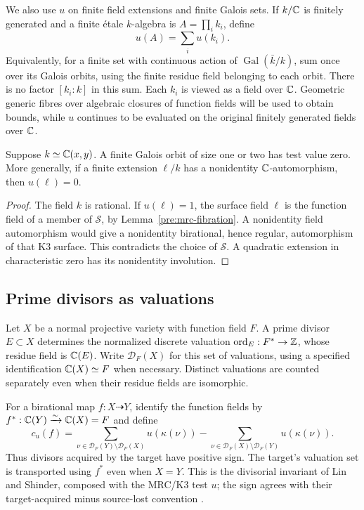 We also use $u$ on finite field extensions and finite Galois sets.
If $k/\mathbb C$ is finitely generated and a finite \mbox{\'{e}tale}
$k$-algebra is $A=\prod_i k_i$, define
\begin{equation}\label{pre:finite-orbits}
 u(A)=\sum_i u(k_i).
\end{equation}
Equivalently, for a finite set with continuous action of
$\operatorname{Gal}(\bar k/k)$, sum once over its Galois orbits, using
the finite residue field belonging to each orbit. There is no factor
$[k_i:k]$ in this sum. Each $k_i$ is viewed as a field over $\mathbb C$.
Geometric generic fibres over algebraic closures of function fields will
be used to obtain bounds, while $u$ continues to be evaluated on the
original finitely generated fields over $\mathbb C$.

\begin{lemma}\label{pre:small-orbits}
Suppose $k\simeq\mathbb C(x,y)$. A finite Galois orbit of size one or two
has test value zero. More generally, if a finite extension $\ell/k$
has a nonidentity $\mathbb C$-automorphism, then $u(\ell)=0$.
\end{lemma}

\begin{proof}
The field $k$ is rational. If $u(\ell)=1$, the surface field $\ell$
is the function field of a member of $\mathcal S$, by
Lemma~\ref{pre:mrc-fibration}. A nonidentity field automorphism would
give a nonidentity birational, hence regular, automorphism of that K3
surface. This contradicts the choice of $\mathcal S$. A quadratic
extension in characteristic zero has its nonidentity involution.
\end{proof}

\subsection{Prime divisors as valuations}

Let $X$ be a normal projective variety with function field $F$.
A prime divisor $E\subset X$ determines the normalized discrete
valuation $\operatorname{ord}_E:F^*\to\mathbb Z$, whose residue field is
$\mathbb C(E)$. Write $\mathcal D_F(X)$ for this set of valuations, using
a specified identification $\mathbb C(X)\simeq F$ when necessary. Distinct
valuations are counted separately even when their residue fields are
isomorphic.

For a birational map $f:X\dashrightarrow Y$, identify the function
fields by $f^*: \mathbb C(Y)\xrightarrow{\sim}\mathbb C(X)=F$ and define
\begin{equation}\label{pre:cocycle-definition}
 c_u(f)=
 \sum_{\nu\in\mathcal D_F(Y)\setminus\mathcal D_F(X)}u(\kappa(\nu))
 -\sum_{\nu\in\mathcal D_F(X)\setminus\mathcal D_F(Y)}u(\kappa(\nu)).
\end{equation}
Thus divisors acquired by the target have positive sign. The target's
valuation set is transported using $f^*$ even when $X=Y$.
This is the divisorial invariant of Lin and Shinder, composed with the
MRC/K3 test \(u\); the sign agrees with their target-acquired minus
source-lost convention
\cite[Definition~2.1, Lemma~2.2 and Proposition~2.3]{LinShinder24}.

